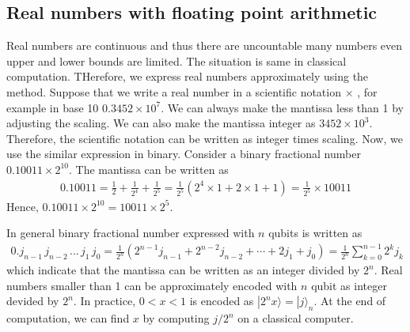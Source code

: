 \documentclass[letterpaper,10pt,english]{jupyterBook}
\begin{document}
\subsection{Real numbers with floating point arithmetic}
\label{\detokenize{composites/numbers:real-numbers-with-floating-point-arithmetic}}
\sphinxAtStartPar
Real numbers are continuous and thus there are uncountable many numbers even upper and lower bounds are limited.  The situation is same in classical computation.  THerefore, we express real numbers approximately using the  method.  Suppose that we write a real number in a scientific notation  \(\times\) , for example in base 10 \(0.3452 \times 10^7\).  We can always make the mantissa less than 1 by adjusting the scaling.  We can also make the mantissa integer as \(3452 \times 10^3\).
Therefore, the scientific notation can be written as integer times scaling.
Now, we use the similar expression in binary.  Consider a binary fractional number \(0.10011 \times 2^{10}\).  The mantissa can be written as
\begin{equation*}
\begin{split}
0.10011 = \frac{1}{2} + \frac{1}{2^4} + \frac{1}{2^5} = \frac{1}{2^5} \left (2^4 \times 1 + 2 \times 1  + 1 \right) =  \frac{1}{2^5} \times 10011
\end{split}
\end{equation*}
\sphinxAtStartPar
Hence, \(0.10011 \times 2^{10} = 10011 \times 2^5\).

\sphinxAtStartPar
In general binary fractional number expressed with \(n\) qubits  is written as
\begin{equation*}
\begin{split}
0.j_{n-1}\,j_{n-2}\,...\,j_1\,j_0 =  \frac{1}{2^n} \left ( 2^{n-1} j_{n-1} + 2^{n-2} j_{n-2} + \cdots + 2 j_1 + j_0 \right)  = \frac{1}{2^n} \sum_{k=0}^{n-1} 2^k j_k
\end{split}
\end{equation*}
\sphinxAtStartPar
which indicate that the mantissa can be written as an integer divided by \(2^n\).
Real numbers smaller than 1 can be approximately encoded with \(n\) qubit as integer devided by \(2^n\).  In practice, \(0<x<1\) is encoded as \(|2^n x\rangle = |j\rangle_n\).  At the end of computation, we can find \(x\) by computing \(j/2^n\) on a classical computer.
\end{document}
